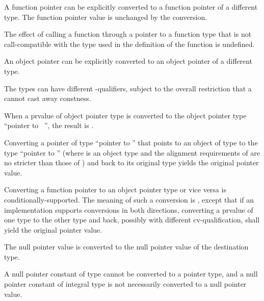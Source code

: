 \pnum
{}%
%
%
A function pointer can be explicitly converted
to a function pointer of a different type.
The function pointer value is unchanged by the conversion.
%
\begin{note}
The effect of calling a function through a pointer to a function
type that is not call-compatible with the type used in the
definition of the function is undefined.
\end{note}

\pnum
An object pointer
can be explicitly converted to an object pointer of a different type.
\begin{footnote}
The
types can have different \cv-qualifiers, subject to
the overall
restriction that a  cannot cast away constness.
\end{footnote}
When a prvalue  of object pointer type is converted to
the object pointer type ``pointer to \cv{}~'', the result is .
\begin{note}
Converting a pointer of type ``pointer to ''
that points to an object of type 
to the type ``pointer to ''
(where  is an object type
and the alignment requirements of 
are no stricter than those of )
and back to its original type yields the original pointer value.
\end{note}

\pnum
Converting a function pointer to an object pointer
type or vice versa is
conditionally-supported. The meaning of such a conversion is
,
except that if an implementation
supports conversions in both directions, converting a prvalue of one type to the other
type and back, possibly with different cv-qualification, shall yield the original
pointer value.

\pnum
The null pointer value is converted to the null pointer value
of the destination type.
\begin{note}
A null pointer constant of type  cannot be converted to a
pointer type, and a null pointer constant of integral type is not necessarily
converted to a null pointer value.
\end{note}


